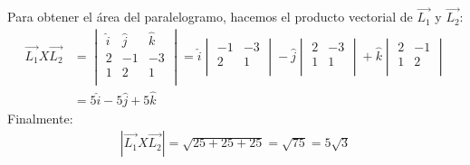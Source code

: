 \documentclass[12pt,openany]{book}
\begin{document}
				Para obtener el \'area del paralelogramo, hacemos el producto vectorial de $\vec{L_{1}}$
				y $\vec{L_{2}}$:
				\begin{equation*}
				 	\begin{split}
				 		\vec{L_{1}}X\vec{L_{2}}&=\begin{vmatrix}
				 									\hat{i} & \hat{j} & \hat{k} \\
				 									   2    &   -1    &    -3   \\
				 									   1    &    2    &     1   \\    
				 								\end{vmatrix}
				 								=\hat{i} \begin{vmatrix}
				 	    										-1 & -3 \\
				 	    										 2 & 1 \\
				 	    									\end{vmatrix}
				 	    							-\hat{j}\begin{vmatrix}
				 	    										2 & -3 \\
				 	    										1 &  1 \\
				 	    									\end{vmatrix}
				 	    						   +\hat{k}\begin{vmatrix}
				 	    										2 & -1 \\
				 	    										1 &  2 \\
				 	    									\end{vmatrix}\\
				 	    					   &=5\hat{i}-5\hat{j}+5\hat{k}
				 	\end{split}
				 \end{equation*}
				 Finalmente:
				\begin{equation*}
				 	\begin{split}
				 		|\vec{L_{1}}X\vec{L_{2}}|=\sqrt{25+25+25}=\sqrt{75}=5\sqrt{3}
				 	\end{split}
				 \end{equation*}
			 
\end{document}
